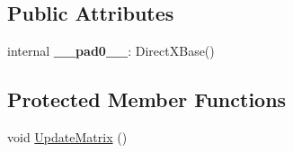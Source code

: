 \subsection*{Public Attributes}
\begin{DoxyCompactItemize}
\item 
\hypertarget{classabstract_a2ec8eb0ec848bf4d7f218c8d6cfc870d}{}internal {\bfseries \+\_\+\+\_\+pad0\+\_\+\+\_\+}\+: Direct\+X\+Base()\label{classabstract_a2ec8eb0ec848bf4d7f218c8d6cfc870d}

\end{DoxyCompactItemize}
\subsection*{Protected Member Functions}
\begin{DoxyCompactItemize}
\item 
void \hyperlink{classabstract_a54ed8fddb5fc83149e11a442803e30b6}{Update\+Matrix} ()
\end{DoxyCompactItemize}
